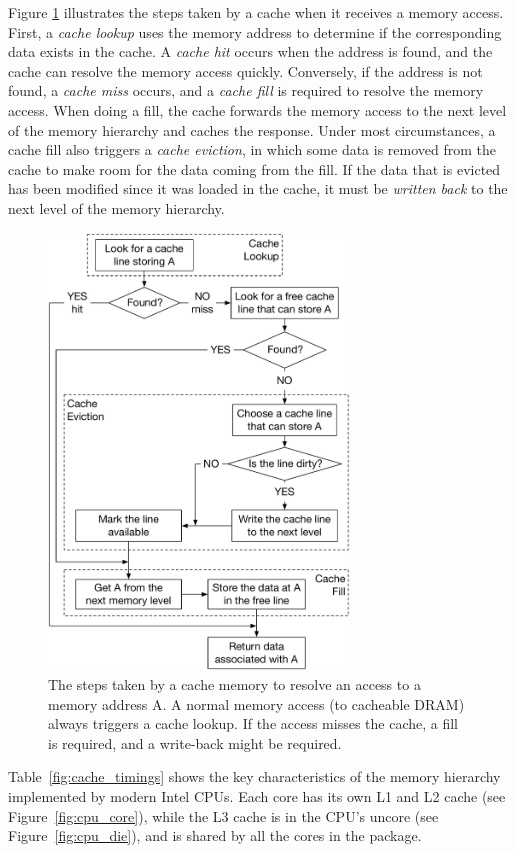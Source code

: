 Figure \ref{fig:cache_lookup} illustrates the steps taken by a cache when it
receives a memory access. First, a \textit{cache lookup} uses the memory
address to determine if the corresponding data exists in the cache. A
\textit{cache hit} occurs when the address is found, and the cache can resolve
the memory access quickly. Conversely, if the address is not found, a
\textit{cache miss} occurs, and a \textit{cache fill} is required to resolve
the memory access. When doing a fill, the cache forwards the memory access to
the next level of the memory hierarchy and caches the response. Under most
circumstances, a cache fill also triggers a \textit{cache eviction}, in which
some data is removed from the cache to make room for the data coming from the
fill. If the data that is evicted has been modified since it was loaded in the
cache, it must be \textit{written back} to the next level of the memory
hierarchy.

\begin{figure}[hbt]
  \centering
  \includegraphics[width=80mm]{figures/cache_lookup.pdf}
  \caption{
    The steps taken by a cache memory to resolve an access to a memory address
    A. A normal memory access (to cacheable DRAM) always triggers a cache
    lookup. If the access misses the cache, a fill is required, and a
    write-back might be required.
  }
  \label{fig:cache_lookup}
\end{figure}

Table~\ref{fig:cache_timings} shows the key characteristics of the memory
hierarchy implemented by modern Intel CPUs. Each core has its own L1 and L2
cache (see Figure~\ref{fig:cpu_core}), while the L3 cache is in the CPU's
uncore (see Figure~\ref{fig:cpu_die}), and is shared by all the cores in the
package.

